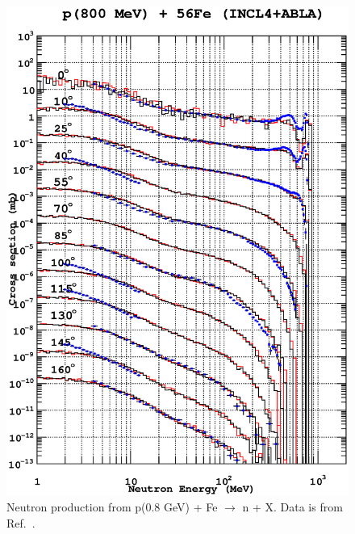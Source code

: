 \documentclass[a4paper]{jpconf}
\begin{document}
\begin{figure}
\begin{center}
\includegraphics[scale=0.70]{images/proton800MeVFe.eps}
\caption{\label{fig:neutron08Fe}Neutron production from p(0.8 GeV) + Fe  $\rightarrow$ n + X. 
Data is from Ref.~\cite{data}.}
\end{center}

\end{figure}
\end{document}

